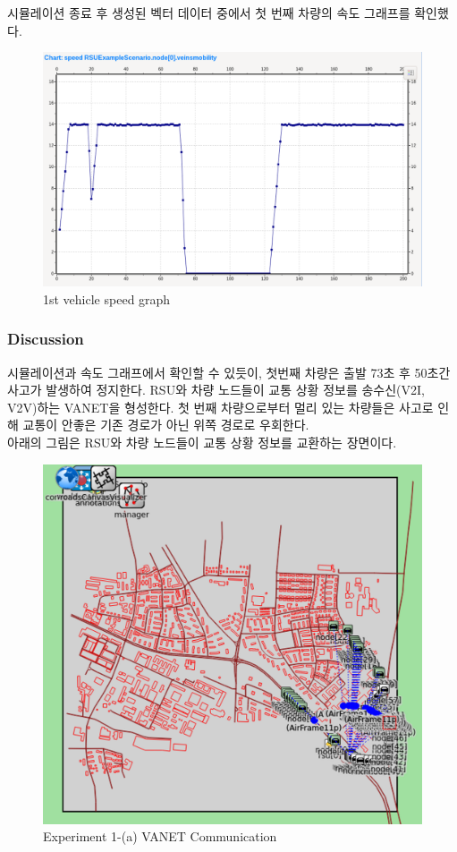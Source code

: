             시뮬레이션 종료 후 생성된 벡터 데이터 중에서 첫 번째 차량의 속도 그래프를 확인했다.
            \begin{figure}[!h]\centering 
                \includegraphics[width=.68\textwidth]{image/week13/1-3.png}
                \caption{\footnotesize
                1st vehicle speed graph}
                \vspace{-10pt}
            \end{figure}
            
        \subsubsection*{Discussion}
            시뮬레이션과 속도 그래프에서 확인할 수 있듯이, 첫번째 차량은 출발 73초 후 50초간 사고가 발생하여 정지한다. RSU와 차량 노드들이 교통 상황 정보를 송수신(V2I, V2V)하는 VANET을 형성한다. 첫 번째 차량으로부터 멀리 있는 차량들은 사고로 인해 교통이 안좋은 기존 경로가 아닌 위쪽 경로로 우회한다. \\
            아래의 그림은 RSU와 차량 노드들이 교통 상황 정보를 교환하는 장면이다.
            \begin{figure}[!h]\centering 
                \includegraphics[width=.50\textwidth]{image/week13/1-4.png}
                \caption{\footnotesize
                Experiment 1-(a) VANET Communication}
                \vspace{-10pt}
            \end{figure}
\newpage
            
